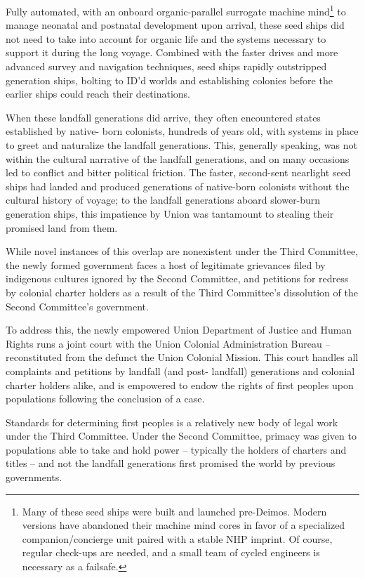 Fully automated, with an onboard organic-parallel surrogate machine mind\footnote{Many of these seed ships were built and launched pre-Deimos. Modern versions have abandoned their
machine mind cores in favor of a specialized companion/concierge unit paired with a stable NHP imprint. Of
course, regular check-ups are needed, and a small team of cycled engineers is necessary as a failsafe.} to manage neonatal
and postnatal development upon arrival, these seed ships did not need to take into account for
organic life and the systems necessary to support it during the long voyage. Combined with the
faster drives and more advanced survey and navigation techniques, seed ships rapidly
outstripped generation ships, bolting to ID'd worlds and establishing colonies before the earlier
ships could reach their destinations.

When these landfall generations did arrive, they often encountered states established by native-
born colonists, hundreds of years old, with systems in place to greet and naturalize the landfall
generations. This, generally speaking, was not within the cultural narrative of the landfall
generations, and on many occasions led to conflict and bitter political friction. The faster,
second-sent nearlight seed ships had landed and produced generations of native-born colonists
without the cultural history of voyage; to the landfall generations aboard slower-burn generation
ships, this impatience by Union was tantamount to stealing their promised land from them.

While novel instances of this overlap are nonexistent under the Third Committee, the newly
formed government faces a host of legitimate grievances filed by indigenous cultures ignored by
the Second Committee, and petitions for redress by colonial charter holders as a result of the
Third Committee's dissolution of the Second Committee's government.

To address this, the newly empowered Union Department of Justice and Human Rights runs a
joint court with the Union Colonial Administration Bureau -- reconstituted from the defunct the
Union Colonial Mission. This court handles all complaints and petitions by landfall (and post-
landfall) generations and colonial charter holders alike, and is empowered to endow the rights of
first peoples upon populations following the conclusion of a case.

Standards for determining first peoples is a relatively new body of legal work under the Third
Committee. Under the Second Committee, primacy was given to populations able to take and
hold power -- typically the holders of charters and titles -- and not the landfall generations first
promised the world by previous governments.

